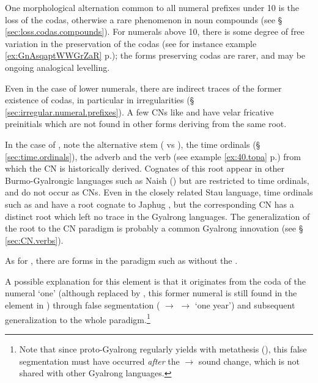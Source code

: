 One morphological alternation common to all numeral prefixes under 10 is the loss of the codas, otherwise a rare phenomenon in noun compounds (see § \ref{sec:loss.codas.compounds}). For numerals above 10, there is some degree of free variation in the preservation of the codas (see for instance example \ref{ex:GnAsqaptWWGrZaR} p.\pageref{ex:GnAsqaptWWGrZaR}); the forms preserving codas are rarer, and may be ongoing analogical levelling.

Even in the case of lower numerals, there are indirect traces of the former existence of codas, in particular in irregularities (§ \ref{sec:irregular.numeral.prefixes}). A few CNs like  and  have velar fricative preinitials  which are not found in other forms deriving from the same root. 

In the case of , note the alternative stem  ( vs ), the time ordinals (§ \ref{sec:time.ordinals}), the adverb  and the verb   (see example \ref{ex:40.topa} p.\pageref{ex:40.topa}) from which the CN  is historically derived. Cognates of this root  appear in other Burmo-Gyalrongic languages such as Naish (\citealt{jacques.michaud11naish}) but are restricted to time ordinals, and do not occur as CNs. Even in the closely related Stau language,  time ordinals such as  and  have a root  cognate to Japhug , but the corresponding CN  has a distinct root which left no trace in the Gyalrong languages. The generalization of the  root to the CN paradigm is probably a common Gyalrong innovation (see § \ref{sec:CN.verbs}).

As for , there are forms in the paradigm such as  without the . 

A possible explanation for this  element is that it originates from the coda of the numeral `one' (although replaced by , this former numeral is still found in the element  in ) through false segmentation ( $\rightarrow$  $\rightarrow$  `one year') and subsequent generalization to the whole paradigm.\footnote{Note that since proto-Gyalrong  regularly yields  with metathesis (\citealt[272]{jacques04these}), this false segmentation must have occurred \textit{after} the  $\rightarrow$ sound change, which is not shared with other Gyalrong languages. }


